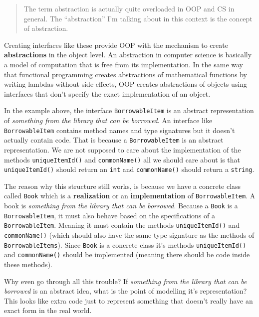 \begin{quote}
The term abstraction is actually quite overloaded in OOP and CS in
general. The ``abstraction'' I'm talking about in this context is the
concept of abstraction.
\end{quote}

Creating interfaces like these provide OOP with the mechanism to create
\textbf{abstractions} in the object level. An abstraction in computer
science is basically a model of computation that is free from its
implementation. In the same way that functional programming creates
abstractions of mathematical functions by writing lambdas without side
effects, OOP creates abstractions of objects using interfaces that don't
specify the exact implementation of an object.

In the example above, the interface \texttt{BorrowableItem} is an
abstract representation of \emph{something from the library that can be
borrowed}. An interface like \texttt{BorrowableItem} contains method
names and type signatures but it doesn't actually contain code. That is
because a \texttt{BorrowableItem} is an abstract representation. We are
not supposed to care about the implementation of the methods
\texttt{uniqueItemId()} and \texttt{commonName()} all we should care
about is that \texttt{uniqueItemId()} should return an \texttt{int} and
\texttt{commonName()} should return a \texttt{string}.

The reason why this structure still works, is because we have a concrete
class called \texttt{Book} which is a \textbf{realization} or an
\textbf{implementation} of \texttt{BorrowableItem}. A book is
\emph{something from the library that can be borrowed}. Because a
\texttt{Book} is a \texttt{BorrowableItem}, it must also behave based on
the specifications of a \texttt{BorrowableItem}. Meaning it must contain
the methods \texttt{uniqueItemId()} and \texttt{commonName()} (which
should also have the same type signature as the methods of
\texttt{BorrowableItems}). Since \texttt{Book} is a concrete class it's
methods \texttt{uniqueItemId()} and \texttt{commonName()} should be
implemented (meaning there should be code inside these methods).

Why even go through all this trouble? If \emph{something from the
library that can be borrowed} is an abstract idea, what is the point of
modelling it's representation? This looks like extra code just to
represent something that doesn't really have an exact form in the real
world.

